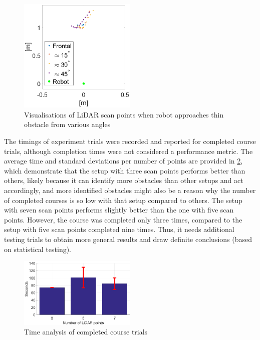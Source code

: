 \begin{figure}
\centering
\includegraphics[width=0.5\textwidth]{slike/lidar_tocke.png}
\caption{Visualisations of LiDAR scan points when robot approaches thin obstacle from various angles}
\label{Fig:Tocke}
\end{figure}

The timings of experiment trials were recorded and reported for completed course trials, although completion times were not considered a performance metric. The average time and standard deviations per number of points are provided in \cref{Fig:Vrimena}, which demonstrate that the setup with three scan points performs better than others, likely because it can identify more obstacles than other setups and act accordingly, and more identified obstacles might also be a reason why the number of completed courses is so low with that setup compared to others. The setup with seven scan points performs slightly better than the one with five scan points. However, the course was completed only three times, compared to the setup with five scan points completed nine times. Thus, it needs additional testing trials to obtain more general results and draw definite conclusions (based on statistical testing).

\begin{figure}
\centering
\includegraphics[width=0.5\textwidth]{slike/vrimena}
\caption{Time analysis of completed course trials}
\label{Fig:Vrimena}
\end{figure}

